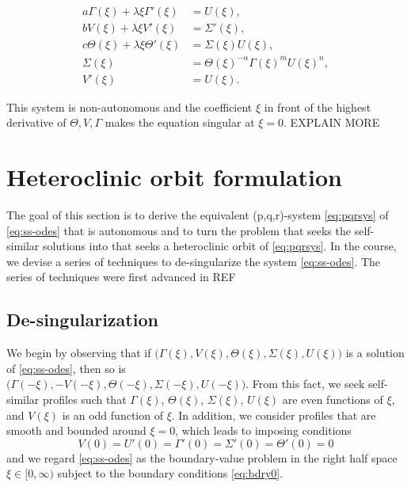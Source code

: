 \documentclass[a4paper,11pt]{article}
\begin{document}
\begin{equation}
\begin{aligned}
 a \Gamma(\xi) + \lambda \xi \Gamma'(\xi) &= U(\xi),\\
 b V(\xi) + \lambda \xi V'(\xi) &= \Sigma'(\xi),\\
 c \Theta(\xi) + \lambda \xi \Theta'(\xi)&=\Sigma(\xi) U(\xi),\\
 \Sigma(\xi) &= \Theta(\xi)^{-\alpha} \Gamma(\xi)^m U(\xi)^n,\\
 V'(\xi)&=U(\xi).
\end{aligned} \label{eq:ss-odes}
\end{equation}

This system is non-autonomous and the coefficient $\xi$ in front of the highest derivative of $\Theta, V, \Gamma$ makes the equation singular at $\xi=0$. EXPLAIN MORE

\section{Heteroclinic orbit formulation}
The goal of this section is to derive the equivalent (p,q,r)-system \eqref{eq:pqrsys} of \eqref{eq:ss-odes} that is autonomous and to turn the problem that seeks the self-similar solutions into that seeks a heteroclinic orbit of \eqref{eq:pqrsys}. In the course, we devise a series of techniques to de-singularize the system \eqref{eq:ss-odes}. The series of techniques were first advanced in REF

\subsection{De-singularization}
We begin by observing that if $\big(\Gamma(\xi), V(\xi), \Theta(\xi), \Sigma(\xi), U(\xi)\big)$ is a solution of \eqref{eq:ss-odes}, then so is \\$\big(\Gamma(-\xi), -V(-\xi), \Theta(-\xi), \Sigma(-\xi), U(-\xi)\big)$. From this fact, we seek self-similar profiles such that $\Gamma(\xi)$, $\Theta(\xi)$, $\Sigma(\xi)$, $U(\xi)$ are even functions of $\xi$, and $V(\xi)$ is an odd function of $\xi$. In addition, we consider profiles that are smooth and bounded around $\xi=0$, which leads to imposing conditions
\begin{equation}
 V(0)=U'(0)=\Gamma'(0)=\Sigma'(0)=\Theta'(0)=0 \label{eq:bdry0}
\end{equation}
and we regard \eqref{eq:ss-odes} as the boundary-value problem in the right half space $\xi \in [0,\infty)$ subject to the boundary conditions \eqref{eq:bdry0}. 
\end{document}
